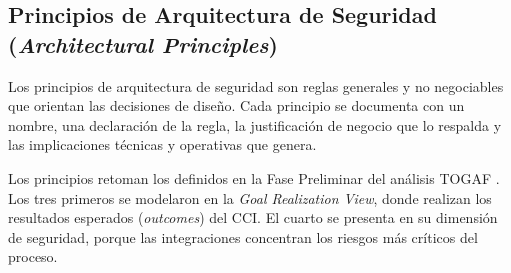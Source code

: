 \subsection{Principios de Arquitectura de Seguridad (\textit{Architectural Principles})}

Los principios de arquitectura de seguridad son reglas generales y no negociables que orientan las decisiones de diseño. Cada principio se documenta con un nombre, una declaración de la regla, la justificación de negocio que lo respalda y las implicaciones técnicas y operativas que genera.

Los principios retoman los definidos en la Fase Preliminar del análisis TOGAF \parencite{togaf2022,fase1cci2026}. Los tres primeros se modelaron en la \textit{Goal Realization View}, donde realizan los resultados esperados (\textit{outcomes}) del CCI. El cuarto se presenta en su dimensión de seguridad, porque las integraciones concentran los riesgos más críticos del proceso.

